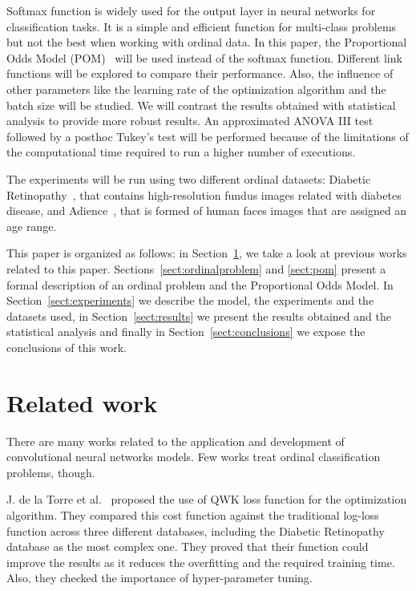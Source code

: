 \documentclass[journal]{IEEEtran}
\begin{document}
	Softmax function is widely used for the output layer in neural networks for classification tasks. It is a simple and efficient function for multi-class problems but not the best when working with ordinal data. In this paper, the Proportional Odds Model (POM)~\cite{gutierrez2016ordinal,agresti2010analysis} will be used instead of the softmax function. Different link functions will be explored to compare their performance. Also, the influence of other parameters like the learning rate of the optimization algorithm and the batch size will be studied. We will contrast the results obtained with statistical analysis to provide more robust results. An approximated ANOVA III \cite{miller1997beyond} test followed by a posthoc Tukey's test \cite{tukey1949comparing} will be performed because of the limitations of the computational time required to run a higher number of executions.
	
	The experiments will be run using two different ordinal datasets: Diabetic Retinopathy~\cite{de2018weighted}, that contains high-resolution fundus images related with diabetes disease, and Adience~\cite{beckham2017unimodal}, that is formed of human faces images that are assigned an age range.
	
	This paper is organized as follows: in Section~\ref{sect:relatedwork}, we take a look at previous works related to this paper. Sections~\ref{sect:ordinalproblem} and \ref{sect:pom} present a formal description of an ordinal problem and the Proportional Odds Model. In Section~\ref{sect:experiments} we describe the model, the experiments and the datasets used, in Section~\ref{sect:results} we present the results obtained and the statistical analysis and finally in Section~\ref{sect:conclusions} we expose the conclusions of this work.
	
	\section{Related work}
	\label{sect:relatedwork}
	There are many works related to the application and development of convolutional neural networks models. Few works treat ordinal classification problems, though.
	
	J. de la Torre et al.~\cite{de2018weighted} proposed the use of QWK loss function for the optimization algorithm. They compared this cost function against the traditional log-loss function across three different databases, including the Diabetic Retinopathy database as the most complex one. They proved that their function could improve the results as it reduces the overfitting and the required training time. Also, they checked the importance of hyper-parameter tuning.
	
\end{document}
